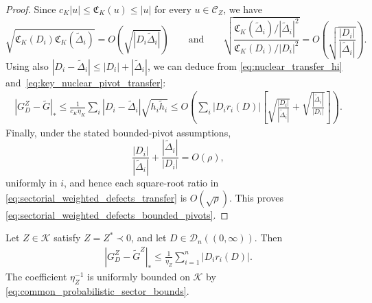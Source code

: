 \documentclass[EJP, preprint, NODS, nobera, nofontexpansion]{ejpecp}
\begin{document}
\begin{proof}
Since $c_K|u|\leq\mathfrak C_K(u)\leq|u|$ for every
$u\in\mathcal C_Z$, we have 
\[
    \sqrt{
        \mathfrak C_K(D_i)\mathfrak C_K(\widetilde\Delta_i)
    }
    =
    O\!\left(
        \sqrt{|D_i\widetilde\Delta_i|}
    \right)
\qquad \text{and}\qquad  
    \sqrt{
        \frac{
            \mathfrak C_K(\widetilde\Delta_i)/
            |\widetilde\Delta_i|^2
        }{
            \mathfrak C_K(D_i)/|D_i|^2
        }
    }
    =
    O\!\left(
        \sqrt{\frac{|D_i|}{|\widetilde\Delta_i|}}
    \right).
\] 
Using also 
$|D_i-\widetilde\Delta_i|
    \leq
    |D_i|+|\widetilde\Delta_i|$,
we can deduce from \eqref{eq:nuclear_transfer_hi} and~\eqref{eq:key_nuclear_pivot_transfer}: 
\begin{align}
    \label{eq:sectorial_weighted_defects_transfer}
|G_D^Z-\widetilde G|_*\leq
\frac1{c_K\eta_K}
\sum_i|D_i-\widetilde\Delta_i|\sqrt{h_i\widetilde h_i}
\leq
    O\!\left(
        \sum_i
        |D_i r_i(D)|
        \left[
            \sqrt{\frac{|D_i|}{|\widetilde\Delta_i|}}
            +
            \sqrt{\frac{|\widetilde\Delta_i|}{|D_i|}}
        \right]
    \right).
\end{align}
Finally, under the stated bounded-pivot assumptions, 
\[
    \frac{|D_i|}{|\widetilde\Delta_i|}
    +
    \frac{|\widetilde\Delta_i|}{|D_i|}
    =
    O(\rho),
\] 
uniformly in \(i\), and hence each square-root ratio in
\eqref{eq:sectorial_weighted_defects_transfer} is
\(O(\sqrt\rho)\). This proves
\eqref{eq:sectorial_weighted_defects_bounded_pivots}.
\end{proof} 

\begin{corollary}
\label{cor:negative_hermitian_inverse_defect_transfer}
Let \(Z\in\mathcal K\) satisfy \(Z=Z^*\prec0\), and let
\(D\in\mathcal D_n((0,\infty))\). Then
\begin{align}
    |G_D^Z-\widetilde G^Z|_*
    \leq
    \frac1{\eta_Z}
    \sum_{i=1}^n|D_i r_i(D)|.
\end{align}
The coefficient $\eta_Z^{-1}$ is uniformly bounded on $\mathcal K$
by \eqref{eq:common_probabilistic_sector_bounds}.
\end{corollary}
\end{document}
